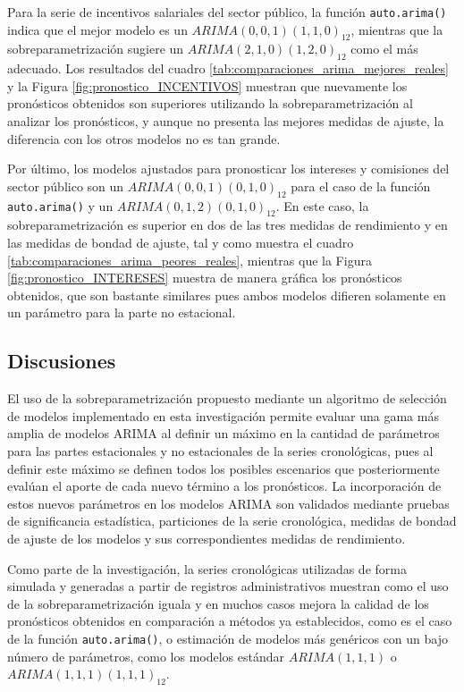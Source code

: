 \documentclass[
]{article}
\begin{document}
Para la serie de incentivos salariales del sector público, la función
\texttt{auto.arima()} indica que el mejor modelo es un
\(ARIMA(0,0,1)(1,1,0)_{12}\), mientras que la sobreparametrización
sugiere un \(ARIMA(2,1,0)(1,2,0)_{12}\) como el más adecuado. Los
resultados del cuadro \ref{tab:comparaciones_arima_mejores_reales} y la
Figura \ref{fig:pronostico_INCENTIVOS} muestran que nuevamente los
pronósticos obtenidos son superiores utilizando la sobreparametrización
al analizar los pronósticos, y aunque no presenta las mejores medidas de
ajuste, la diferencia con los otros modelos no es tan grande.

Por último, los modelos ajustados para pronosticar los intereses y
comisiones del sector público son un \(ARIMA(0,0,1)(0,1,0)_{12}\) para
el caso de la función \texttt{auto.arima()} y un
\(ARIMA(0,1,2)(0,1,0)_{12}\). En este caso, la sobreparametrización es
superior en dos de las tres medidas de rendimiento y en las medidas de
bondad de ajuste, tal y como muestra el cuadro
\ref{tab:comparaciones_arima_peores_reales}, mientras que la Figura
\ref{fig:pronostico_INTERESES} muestra de manera gráfica los pronósticos
obtenidos, que son bastante similares pues ambos modelos difieren
solamente en un parámetro para la parte no estacional.

\subsection{Discusiones}

El uso de la sobreparametrización propuesto mediante un algoritmo de
selección de modelos implementado en esta investigación permite evaluar
una gama más amplia de modelos ARIMA al definir un máximo en la cantidad
de parámetros para las partes estacionales y no estacionales de la
series cronológicas, pues al definir este máximo se definen todos los
posibles escenarios que posteriormente evalúan el aporte de cada nuevo
término a los pronósticos. La incorporación de estos nuevos parámetros
en los modelos ARIMA son validados mediante pruebas de significancia
estadística, particiones de la serie cronológica, medidas de bondad de
ajuste de los modelos y sus correspondientes medidas de rendimiento.

Como parte de la investigación, la series cronológicas utilizadas de
forma simulada y generadas a partir de registros administrativos
muestran como el uso de la sobreparametrización iguala y en muchos casos
mejora la calidad de los pronósticos obtenidos en comparación a métodos
ya establecidos, como es el caso de la función \texttt{auto.arima()}, o
estimación de modelos más genéricos con un bajo número de parámetros,
como los modelos estándar \(ARIMA(1,1,1)\) o
\(ARIMA(1,1,1)(1,1,1)_{12}\).
\end{document}
